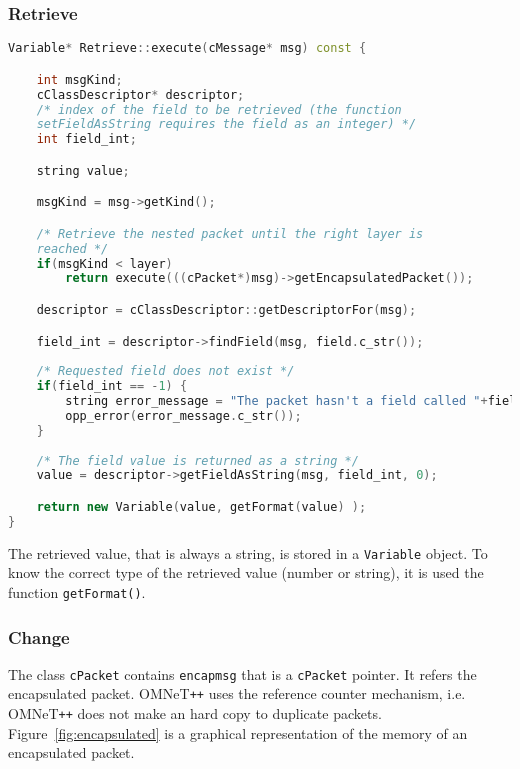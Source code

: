 \subsubsection{Retrieve}
%
\begin{lstlisting}[language={cpp}]
Variable* Retrieve::execute(cMessage* msg) const {

	int msgKind;
	cClassDescriptor* descriptor;
	/* index of the field to be retrieved (the function 
	setFieldAsString requires the field as an integer) */
	int field_int; 

	string value;

	msgKind = msg->getKind();

	/* Retrieve the nested packet until the right layer is 
	reached */
	if(msgKind < layer)
		return execute(((cPacket*)msg)->getEncapsulatedPacket());

	descriptor = cClassDescriptor::getDescriptorFor(msg);

	field_int = descriptor->findField(msg, field.c_str());
	
	/* Requested field does not exist */
	if(field_int == -1) {
		string error_message = "The packet hasn't a field called "+field;
		opp_error(error_message.c_str());
	}
	
	/* The field value is returned as a string */
	value = descriptor->getFieldAsString(msg, field_int, 0);

	return new Variable(value, getFormat(value) );
}
\end{lstlisting}
%
The retrieved value, that is always a string, is stored in a \texttt{Variable} object. To know the correct type of the retrieved value (number or string), it is used the function \texttt{getFormat()}. 


\subsubsection{Change}
\label{sec:CopyPackets}
%
\iffalse
To understand his implementation is necessary explain how OMNeT++ encapsulates the packets and how makes a copy of them.
\fi
%
The class \texttt{cPacket} contains \texttt{encapmsg} that is a \texttt{cPacket} pointer. It refers the encapsulated packet. OMNeT\texttt{++} uses the reference counter mechanism, i.e. OMNeT\texttt{++} does not make an hard copy to duplicate packets. Figure~\ref{fig:encapsulated} is a graphical representation of the memory of an encapsulated packet.
%
\begin{figure}
\centering
{}\\
\\
\end{figure} 


